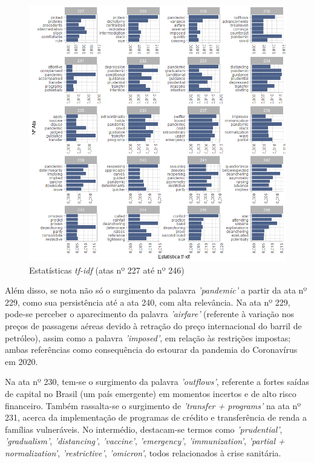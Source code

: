 \begin{figure}[hbtp]
	\centering
	\caption{Estatísticas \textit{tf-idf} (atas nº 227 até nº 246)} \label{figure:tf_idf}
	\includegraphics[scale = 0.75]{figuras/tf_idf_copom_text_refined.png}
\end{figure}

Além disso, se nota não só o surgimento da palavra \textit{'pandemic'} a partir da ata nº 229, como sua persistência até a ata 240, com alta relevância. Na ata nº 229, pode-se perceber o aparecimento da palavra \textit{'airfare'} (referente à variação nos preços de passagens aéreas devido à retração do preço internacional do barril de petróleo), assim como a palavra \textit{'imposed'}, em relação às restrições impostas; ambas referências como consequência do estourar da pandemia do Coronavírus em 2020. 

Na ata nº 230, tem-se o surgimento da palavra \textit{'outflows'}, referente a fortes saídas de capital no Brasil (um país emergente) em momentos incertos e de alto risco financeiro. Também rassalta-se o surgimento de \textit{'transfer + programs'} na ata nº 231, acerca da implementação de programas de crédito e transferência de renda a famílias vulneráveis. No intermédio, destacam-se termos como \textit{'prudential'}, \textit{'gradualism'}, \textit{'distancing'}, \textit{'vaccine'}, \textit{'emergency'}, \textit{'immunization'}, \textit{'partial + normalization'}, \textit{'restrictive'}, \textit{'omicron'}, todos relacionados à crise sanitária. 

